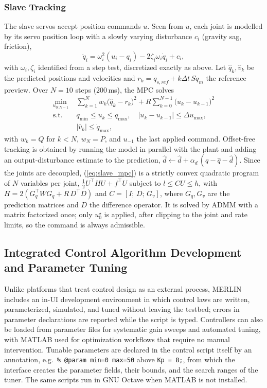 \documentclass[a4paper, 10pt, conference]{ieeeconf}      %
\begin{document}
\subsubsection{Slave Tracking}
The slave servos accept position commands $u$. Seen from $u$, each joint is modelled by its servo position loop with a slowly varying disturbance $c_i$ (gravity sag, friction),
\begin{equation}
\ddot q_i=\omega_i^{2}(u_i-q_i)-2\zeta_i\omega_i\dot q_i+c_i ,
\label{eq:loop}
\end{equation}
with $\omega_i,\zeta_i$ identified from a step test, discretized exactly as above. Let $\hat q_k,\hat v_k$ be the predicted positions and velocities and $r_k=q_{s,ref}+k\Delta t\,S\dot q_m$ the reference preview. Over $N=10$ steps ($200$\,ms), the MPC solves
\begin{equation}
\begin{aligned}
\min_{u_{0:N-1}}\;&\sum_{k=1}^{N}w_k\big(\hat q_k-r_k\big)^{2}+R\sum_{k=0}^{N-1}\big(u_k-u_{k-1}\big)^{2}\\
\text{s.t.}\;&q_{\min}\le u_k\le q_{\max},\quad|u_k-u_{k-1}|\le\Delta u_{\max},\\
&|\hat v_k|\le\dot q_{\max},
\end{aligned}
\label{eq:slave_mpc}
\end{equation}
with $w_k=Q$ for $k<N$, $w_N=P$, and $u_{-1}$ the last applied command. Offset-free tracking \cite{pannocchia2003,muske2002} is obtained by running the model in parallel with the plant and adding an output-disturbance estimate to the prediction, $\hat d\leftarrow\hat d+\alpha_d\,(q-\hat q-\hat d)$. Since the joints are decoupled, (\ref{eq:slave_mpc}) is a strictly convex quadratic program of $N$ variables per joint, $\tfrac12U^{\top}HU+f^{\top}U$ subject to $l\le CU\le h$, with $H=2(G_q^{\top}WG_q+R\,D^{\top}D)$ and $C=[I;\,D;\,G_v]$, where $G_q,G_v$ are the prediction matrices and $D$ the difference operator. It is solved by ADMM \cite{boyd2011admm,stellato2020osqp} with a matrix factorized once; only $u_0^{\star}$ is applied, after clipping to the joint and rate limits, so the command is always admissible.

\subsection{Integrated Control Algorithm Development and Parameter Tuning}
Unlike platforms that treat control design as an external process, MERLIN includes an in-UI development environment in which control laws are written, parameterized, simulated, and tuned without leaving the testbed; errors in parameter declarations are reported while the script is typed. Controllers can also be loaded from parameter files for systematic gain sweeps and automated tuning, with MATLAB used for optimization workflows that require no manual intervention. Tunable parameters are declared in the control script itself by an annotation, e.g.\ \texttt{\% @param min=0 max=50} above \texttt{Kp = 8;}, from which the interface creates the parameter fields, their bounds, and the search ranges of the tuner. The same scripts run in GNU Octave when MATLAB is not installed.
\end{document}
